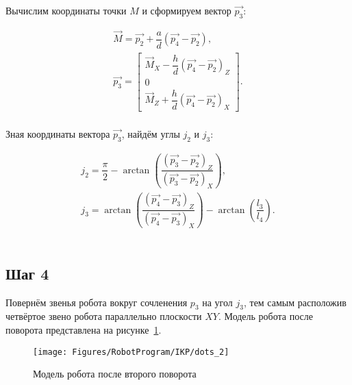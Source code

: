Вычислим координаты точки $M$ и сформируем вектор $\overrightarrow{p_3}$:

\begin{gather*}
    \overrightarrow{M} = \overrightarrow{p_2} + \dfrac{a}{d} \left( \overrightarrow{p_4} - \overrightarrow{p_2} \right), \\
    \overrightarrow{p_3} =
    \begin{bmatrix}
        \overrightarrow{M}_X - \dfrac{h}{d} \left( \overrightarrow{p_4} - \overrightarrow{p_2} \right)_Z \\
        0                                                                                                \\
        \overrightarrow{M}_Z + \dfrac{h}{d} \left( \overrightarrow{p_4} - \overrightarrow{p_2} \right)_X
    \end{bmatrix}.
\end{gather*} \\

Зная координаты вектора $\overrightarrow{p_3}$, найдём углы $j_2$ и $j_3$:

\begin{gather*}
    j_2 = \dfrac{\pi}{2} - \arctan \left( \dfrac
    {\left( \overrightarrow{p_3} - \overrightarrow{p_2} \right)_Z}
    {\left( \overrightarrow{p_3} - \overrightarrow{p_2} \right)_X} \right), \\
    j_3 = \arctan \left( \dfrac
    {\left( \overrightarrow{p_4} - \overrightarrow{p_3} \right)_Z}
    {\left( \overrightarrow{p_4} - \overrightarrow{p_3} \right)_X} \right) - \arctan\left( \dfrac{l_3}{l_4} \right).
\end{gather*} \\

\subsection*{Шаг 4}
Повернём звенья робота вокруг сочленения $p_3$ на угол $j_3$, тем самым расположив четвёртое звено робота параллельно плоскости $XY$.
Модель робота после поворота представлена на рисунке~\ref{fig:RobotProgram:IKP:dots_2}.

\begin{figure}[H]
    \centering
    \vspace{14pt}
    \texttt{[image: Figures/RobotProgram/IKP/dots\_2]}
    \caption{Модель робота после второго поворота}
    \label{fig:RobotProgram:IKP:dots_2}
\end{figure}

